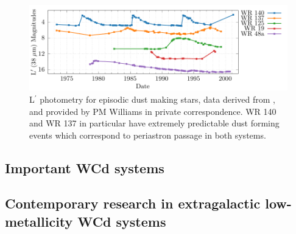 \begin{figure}
  \centering
  \includegraphics[]{assets/magnitudes/magnitudes.pdf}
  \caption[L$^\prime$ photometry of episodic dust making stars]{L$^\prime$ photometry for episodic dust making stars, data derived from \textcite{crowther_dust_2003}, and provided by PM Williams in private correspondence. WR 140 and WR 137 in particular have extremely predictable dust forming events which correspond to periastron passage in both systems.}
  \label{fig:periodicmags}
\end{figure}


\subsection{Important WCd systems}

\subsection{Contemporary research in extragalactic low-metallicity WCd systems}

\label{sec:knowndustysystems}

